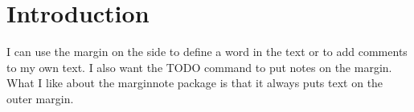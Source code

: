 \chapter{Introduction}


I can use the  margin on the side to define a word in the text or to add comments to
my own text. I also want the TODO command to put notes on the margin. What I
like about the marginnote package is that it always puts text on the outer
margin.
